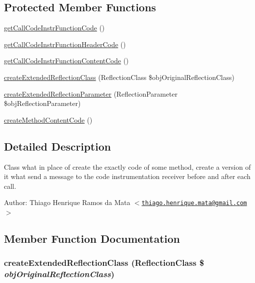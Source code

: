 \subsection*{Protected Member Functions}
\begin{CompactItemize}
\item 
\hyperlink{class_code_instrumentation_method_5df850508e727984f62860b6987991c0}{getCallCodeInstrFunctionCode} ()
\item 
\hyperlink{class_code_instrumentation_method_bd8673f90786848f90fb3c0940c604a6}{getCallCodeInstrFunctionHeaderCode} ()
\item 
\hyperlink{class_code_instrumentation_method_ed55cb9e7235755c7fdab2dc01eb4f47}{getCallCodeInstrFunctionContentCode} ()
\item 
\hyperlink{class_code_instrumentation_method_6b56ec198bc6a5b5a72076e4e7c19e29}{createExtendedReflectionClass} (ReflectionClass \$objOriginalReflectionClass)
\item 
\hyperlink{class_code_instrumentation_method_98ceb248f2b535a3a83ac2e7990e0c1f}{createExtendedReflectionParameter} (ReflectionParameter \$objReflectionParameter)
\item 
\hyperlink{class_code_instrumentation_method_e38c2891dc093dabb6b363a4de9ac495}{createMethodContentCode} ()
\end{CompactItemize}


\subsection{Detailed Description}
Class what in place of create the exactly code of some method, create a version of it what send a message to the code instrumentation receiver before and after each call.

\begin{Desc}
\item[Author:]Thiago Henrique Ramos da Mata $<$\href{mailto:thiago.henrique.mata@gmail.com}{\tt thiago.henrique.mata@gmail.com}$>$ \end{Desc}


\subsection{Member Function Documentation}
\hypertarget{class_code_instrumentation_method_6b56ec198bc6a5b5a72076e4e7c19e29}{
\subsubsection[{createExtendedReflectionClass}]{\setlength{\rightskip}{0pt plus 5cm}createExtendedReflectionClass (ReflectionClass \$ {\em objOriginalReflectionClass})}}
\label{class_code_instrumentation_method_6b56ec198bc6a5b5a72076e4e7c19e29}


